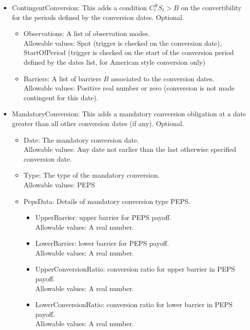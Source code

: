 \begin{itemize}
\item ContingentConversion: This adds a condition $C^R_t S_t > B$ on the convertibility for the periods defined by the
  conversion dates. Optional.
  \begin{itemize}
  \item Observations: A list of observation modes. \\
    Allowable values: Spot (trigger is checked on the conversion date), StartOfPeriod (trigger is checked on the start
    of the conversion period defined by the dates list, for American style conversion only)
  \item Barriers: A list of barriers $B$ associated to the conversion dates. \\
    Allowable values: Positive real number or zero (conversion is not made contingent for this date).
  \end{itemize}

\item MandatoryConversion: This adds a mandatory conversion obligation at a date greater than all other conversion dates
  (if any). Optional.
  \begin{itemize}
  \item Date: The mandatory conversion date.\\
    Allowable values: Any date not earlier than the last otherwise specified conversion date.
  \item Type: The type of the mandatory conversion.\\
    Allowable values: PEPS
  \item PepsData: Details of mandatory conversion type PEPS.
    \begin{itemize}
      \item UpperBarrier: upper barrier for PEPS payoff.\\
        Allowable values: A real number.
      \item LowerBarrier: lower barrier for PEPS payoff.\\
        Allowable values:  A real number.
      \item UpperConversionRatio: conversion ratio for upper barrier in PEPS payoff.\\
        Allowable values: A real number.
      \item LowerConversionRatio: conversion ratio for lower barrier in PEPS payoff.\\
        Allowable values:  A real number.
    \end{itemize}
  \end{itemize}


\end{itemize}
